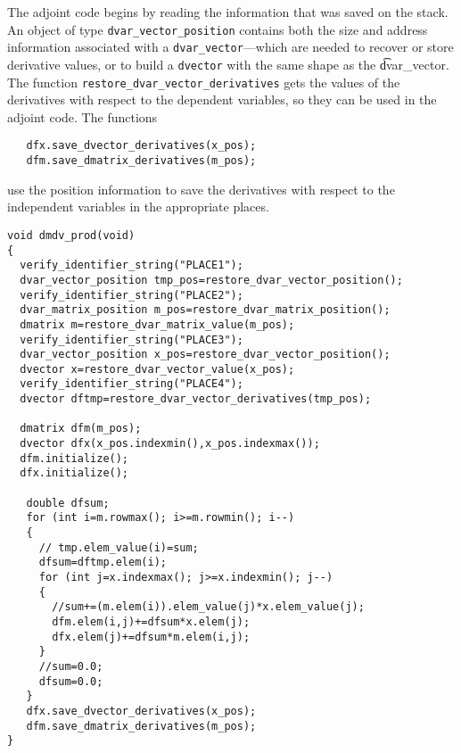 The adjoint code begins by reading the information that was saved on the stack.
An object of type \texttt{dvar\_vector\_position} contains both the size and
address information associated with a \texttt{dvar\_vector}---which are needed to
recover or store derivative values, or to build a \texttt{dvector} with the
same shape as the {\t dvar\_vector}.
The function \texttt{restore\_dvar\_vector\_der\-ivatives} gets the values of the
derivatives with respect to the dependent variables, so they can be used in the
adjoint code. The functions
\begin{lstlisting}
   dfx.save_dvector_derivatives(x_pos);
   dfm.save_dmatrix_derivatives(m_pos);
\end{lstlisting}
use the position information to save the derivatives with respect to the
independent variables in the appropriate places.
\begin{lstlisting}
void dmdv_prod(void)
{
  verify_identifier_string("PLACE1");
  dvar_vector_position tmp_pos=restore_dvar_vector_position();
  verify_identifier_string("PLACE2");
  dvar_matrix_position m_pos=restore_dvar_matrix_position();
  dmatrix m=restore_dvar_matrix_value(m_pos);
  verify_identifier_string("PLACE3");
  dvar_vector_position x_pos=restore_dvar_vector_position();
  dvector x=restore_dvar_vector_value(x_pos);
  verify_identifier_string("PLACE4");
  dvector dftmp=restore_dvar_vector_derivatives(tmp_pos);
  
  dmatrix dfm(m_pos);
  dvector dfx(x_pos.indexmin(),x_pos.indexmax());
  dfm.initialize();
  dfx.initialize();
  
   double dfsum;
   for (int i=m.rowmax(); i>=m.rowmin(); i--)
   {
     // tmp.elem_value(i)=sum;
     dfsum=dftmp.elem(i);
     for (int j=x.indexmax(); j>=x.indexmin(); j--)
     {
       //sum+=(m.elem(i)).elem_value(j)*x.elem_value(j);
       dfm.elem(i,j)+=dfsum*x.elem(j);
       dfx.elem(j)+=dfsum*m.elem(i,j);
     }
     //sum=0.0;
     dfsum=0.0;
   }
   dfx.save_dvector_derivatives(x_pos);
   dfm.save_dmatrix_derivatives(m_pos);
}
\end{lstlisting}
